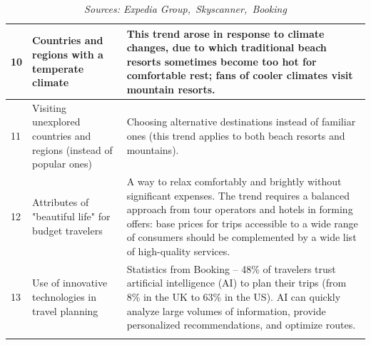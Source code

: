 \begin{longtable}[c]{|l|p{}|p{}|}
10 &
  Countries and regions with a temperate climate &
  This trend arose in response to climate changes, due to which traditional beach resorts sometimes become too hot for comfortable rest; fans of cooler climates visit mountain resorts. \\ \hline
11 &
  Visiting unexplored countries and regions (instead of popular ones) &
  Choosing alternative destinations instead of familiar ones (this trend applies to both beach resorts and mountains). \\ \hline
12 &
  Attributes of "beautiful life" for budget travelers &
  A way to relax comfortably and brightly without significant expenses. The trend requires a balanced approach from tour operators and hotels in forming offers: base prices for trips accessible to a wide range of consumers should be complemented by a wide list of high-quality services. \\ \hline
13 &
  Use of innovative technologies in travel planning &
  Statistics from Booking – 48\% of travelers trust artificial intelligence (AI) to plan their trips (from 8\% in the UK to 63\% in the US). AI can quickly analyze large volumes of information, provide personalized recommendations, and optimize routes. \\ \hline
\caption*{\normalfont \emph{Sources: Expedia Group,~Skyscanner,~Booking}} \\
\end{longtable}

